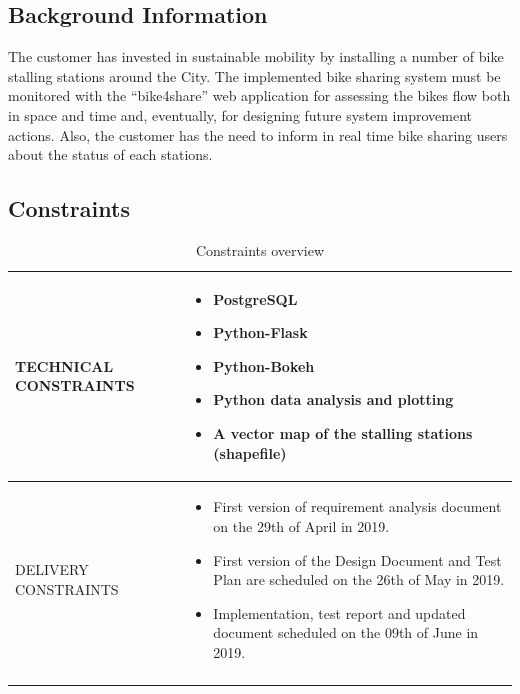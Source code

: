 \documentclass{article}
\begin{document}
\subsection{Background Information}

The  customer has invested in sustainable mobility by installing a number of bike stalling stations around the City. The implemented bike sharing system must be monitored with the “bike4share” web application for assessing the bikes flow both in space and time and, eventually, for designing future system improvement actions. 
Also, the customer has the need to inform in real time bike sharing users about the status of each stations.

\subsection{Constraints}
\begin{longtable}{|p{}|p{}|}
    
    \hline
    TECHNICAL CONSTRAINTS &         \begin{itemize}
                                    \item PostgreSQL
                                    \item Python-Flask 
                                    \item Python-Bokeh
                                    \item Python data analysis and plotting
                                    \item A vector map of the stalling stations (shapefile)
                                    \end{itemize}
                \\
    \hline
      DELIVERY CONSTRAINTS &        \begin{itemize}
                                    \item First version of requirement analysis document on the 29th of April in 2019.	
                                    \item First version of the Design Document and Test Plan are scheduled on the 26th of May in 2019.
                                    \item Implementation, test report and updated document scheduled on the 09th of June in 2019. 
                                    \end{itemize}
             \\
            \hline
\caption{Constraints overview} \\
\end{longtable}
\end{document}
